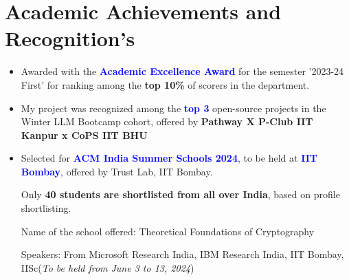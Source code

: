 \documentclass[10.8pt, a4paper]{extarticle}
\newcommand{\shorterSection}[1]{\vspace{-10pt}\section{#1}}
\begin{document}
\shorterSection{Academic Achievements and Recognition's}
\begin{itemize}

 \item Awarded with the \textcolor{blue}{\textbf{Academic Excellence Award}} for the semester '2023-24 First' for ranking among the \textbf{top 10\%} of scorers in the department.\href{https://www.iitk.ac.in/sspc/data/2nd-list-of-Academic-Excellence-Awards-2023-21-03-24.pdf}{\faLink{}}\\[-0.6cm]
 
 
  \item My project was recognized among the \textcolor{blue}{\textbf{top 3 }}open-source projects in the Winter LLM Bootcamp cohort, offered by \textbf{Pathway X P-Club IIT Kanpur x CoPS IIT BHU} \href{https://t.certifier.io/CL0/https:%2F%2Fapi.credsverse.com%2Fv1%2Fusers%2Finvite%2Fceed2b44-26ae-4085-a1c6-291760efed0a/1/0102018ede88dc5e-89a09bd7-6cea-4807-a2c9-3dff747834d9-000000/_U00joiSf7_qp3anDSJNAiO00y7Hxm7ONFmpv6zOP2g=348}{\faLink{}}\\[-0.6cm]


    \item Selected for \textcolor{blue}{\textbf{ACM India Summer Schools 2024}}, to be held at \textcolor{blue}{\textbf{IIT Bombay}}, offered by Trust Lab, IIT Bombay. \href{https://drive.google.com/file/d/1Zrw9ZEbpcHit9Pn9m18AO0EXmoZq-p33/view?usp=sharing}{\faLink{}}
    
    Only \textbf{40 students are shortlisted from all over India}, based on profile shortlisting. 
    
    Name of the school offered: Theoretical Foundations of Cryptography 
    
    Speakers: From Microsoft Research India, IBM Research India, IIT Bombay, IISc\hfill\hfill(\textit{To be held from June 3 to 13, 2024})\\[-0.6cm]



\end{itemize}
\medskip



\end{document}
